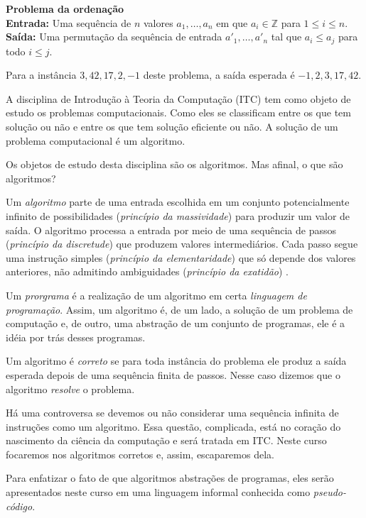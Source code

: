 \begin{example}
  {\bf Problema da ordenação}\\

  {\bf Entrada:} Uma sequência de $n$ valores $a_1, \dots, a_n$ em que $a_i \in \mathbb{Z}$ para $1 \leq i \leq n$.\\

  {\bf Saída:} Uma permutação da sequência de entrada $a'_1, \dots, a'_n$ tal que $a_i \leq a_j$ para todo $i \leq j$.

  Para a instância $3, 42, 17, 2, -1$ deste problema, a saída esperada é $-1, 2, 3, 17, 42$.
\end{example}


A disciplina de Introdução à Teoria da Computação (ITC) tem como objeto de estudo os problemas computacionais.
Como eles se classificam entre os que tem solução ou não e entre os que tem solução eficiente ou não.
A solução de um problema computacional é um algoritmo.

Os objetos de estudo desta disciplina são os algoritmos.
Mas afinal, o que são algoritmos?

Um {\em algoritmo} parte de uma entrada escolhida em um conjunto potencialmente infinito de possibilidades ({\em princípio da massividade}) para produzir um valor de saída.
O algoritmo processa a entrada por meio de uma sequência de passos ({\em princípio da discretude}) que produzem valores intermediários.
Cada passo  segue uma instrução simples ({\em princípio da elementaridade}) que só depende dos valores anteriores, não admitindo ambiguidades ({\em princípio da exatidão}) \cite{malcev70}.

Um {\em prorgrama} é a realização de um algoritmo em certa {\em linguagem de programação}.
Assim, um algoritmo é, de um lado, a solução de um problema de computação e, de outro, uma abstração de um conjunto de programas, ele é a idéia por trás desses programas.

Um algoritmo é {\em correto} se para toda instância do problema ele produz a saída esperada depois de uma sequência finita de passos.
Nesse caso dizemos que o algoritmo {\em resolve} o problema.

Há uma controversa se devemos ou não considerar uma sequência infinita de instruções como um algoritmo.
Essa questão, complicada, está no coração do nascimento da ciência da computação e será tratada em ITC.
Neste curso focaremos nos algoritmos corretos e, assim, escaparemos dela.

Para enfatizar o fato de que algoritmos abstrações de programas, eles serão apresentados neste curso em uma linguagem informal conhecida como {\em pseudo-código}.

